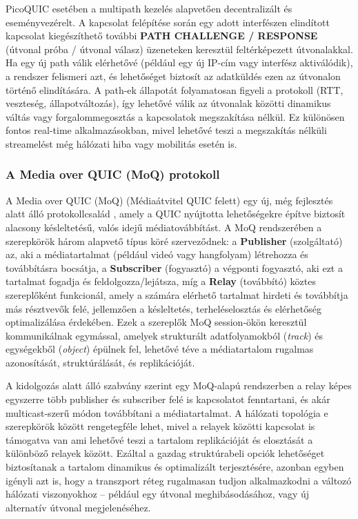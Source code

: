 \documentclass[a4paper,oneside]{article}
\begin{document}
PicoQUIC esetében a multipath kezelés alapvetően decentralizált és eseményvezérelt. 
A kapcsolat felépítése során egy adott interfészen elindított kapcsolat kiegészíthető 
további \textbf{PATH CHALLENGE / RESPONSE} (útvonal próba / útvonal válasz) üzeneteken keresztül feltérképezett 
útvonalakkal. Ha egy új path válik elérhetővé (például egy új IP-cím vagy interfész 
aktiválódik), a rendszer felismeri azt, és lehetőséget biztosít az adatküldés ezen 
az útvonalon történő elindítására. A path-ek állapotát folyamatosan figyeli a protokoll 
(RTT, veszteség, állapotváltozás), így lehetővé válik az útvonalak közötti dinamikus 
váltás vagy forgalommegosztás a kapcsolatok megszakítása nélkül. Ez különösen 
fontos real-time alkalmazásokban, mivel lehetővé teszi a megszakítás nélküli streamelést 
még hálózati hiba vagy mobilitás esetén is.

\subsubsection{A Media over QUIC (MoQ) protokoll}

A Media over QUIC (MoQ) (Médiaátvitel QUIC felett) egy új, még fejlesztés alatt álló protokollcsalád \cite{moq_draft}, 
amely a QUIC nyújtotta lehetőségekre építve biztosít alacsony késleltetésű, 
valós idejű médiatovábbítást. A MoQ rendszerében a szerepkörök három alapvető 
típus köré szerveződnek: a \textbf{Publisher} (szolgáltató) az, aki a médiatartalmat (például 
videó vagy hangfolyam) létrehozza és továbbításra bocsátja, a \textbf{Subscriber} (fogyasztó)
a végponti fogyasztó, aki ezt a tartalmat fogadja és feldolgozza/lejátsza, míg a \textbf{Relay} (továbbító)
köztes szereplőként funkcionál, amely a számára elérhető tartalmat hirdeti és 
továbbítja más résztvevők felé, jellemzően a késleltetés, terheléselosztás 
és elérhetőség optimalizálása érdekében. 
Ezek a szereplők MoQ session-ökön keresztül kommunikálnak egymással, amelyek 
strukturált adatfolyamokból (\emph{track}) és egységekből (\emph{object}) épülnek 
fel, lehetővé téve a médiatartalom rugalmas azonosítását, struktúrálását, és replikációját.

A kidolgozás alatt álló szabvány szerint egy MoQ-alapú rendszerben a relay képes 
egyszerre több publisher és subscriber felé is kapcsolatot fenntartani, 
és akár multicast-szerű módon továbbítani a médiatartalmat. 
A hálózati topológia e szerepkörök között rengetegféle lehet, mivel 
a relayek közötti kapcsolat is támogatva van ami lehetővé teszi
a tartalom replikációját és elosztását a különböző relayek között. 
Ezáltal a gazdag struktúrabeli opciók lehetőséget biztosítanak a tartalom dinamikus 
és optimalizált terjesztésére, azonban egyben igényli azt is, hogy a transzport 
réteg rugalmasan tudjon alkalmazkodni a változó hálózati viszonyokhoz – például 
egy útvonal meghibásodásához, vagy új alternatív útvonal megjelenéséhez.
\end{document}
